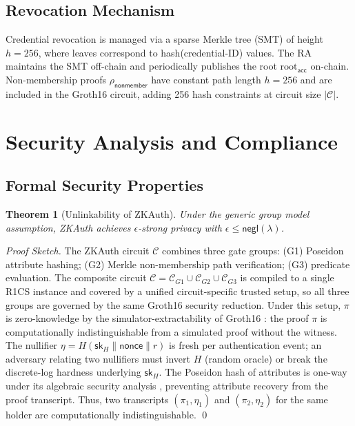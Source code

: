 \documentclass[journal,12pt,onecolumn]{IEEEtran}
\newtheorem{theorem}{Theorem}
\begin{document}
\subsection{Revocation Mechanism}
\label{sec:revocation}

Credential revocation is managed via a sparse Merkle tree (SMT)
\cite{khovratovich2023merkle} of height $h = 256$, where leaves
correspond to hash(credential-ID) values. The RA maintains the SMT
off-chain and periodically publishes the root $\text{root}_{\mathsf{acc}}$
on-chain. Non-membership proofs $\rho_{\mathsf{nonmember}}$ have constant
path length $h = 256$ and are included in the Groth16 circuit, adding
256 hash constraints at circuit size $|\mathcal{C}|$.

\section{Security Analysis and Compliance}
\label{sec:security}

\subsection{Formal Security Properties}

\begin{theorem}[Unlinkability of ZKAuth]
\label{thm:unlinkability}
Under the generic group model assumption, ZKAuth achieves
$\epsilon$-strong privacy with $\epsilon \leq \mathsf{negl}(\lambda)$.
\end{theorem}

\begin{proof}[Proof Sketch]
The ZKAuth circuit $\mathcal{C}$ combines three gate groups:
(G1) Poseidon attribute hashing; (G2) Merkle non-membership path
verification; (G3) predicate evaluation. The composite circuit
$\mathcal{C} = \mathcal{C}_{G1} \cup \mathcal{C}_{G2} \cup \mathcal{C}_{G3}$
is compiled to a single R1CS instance and covered by a unified
circuit-specific trusted setup, so all three groups are governed by
the same Groth16 security reduction. Under this setup, $\pi$ is
zero-knowledge by the simulator-extractability of Groth16
\cite{groth2016size}: the proof $\pi$ is computationally
indistinguishable from a simulated proof without the witness. The
nullifier $\eta = H(\mathsf{sk}_H \| \mathsf{nonce} \| r)$ is
fresh per authentication event; an adversary relating two nullifiers
must invert $H$ (random oracle) or break the discrete-log hardness
underlying $\mathsf{sk}_H$. The Poseidon hash of attributes is
one-way under its algebraic security analysis
\cite{grassi2021poseidon}, preventing attribute recovery from the
proof transcript. Thus, two transcripts $(\pi_1, \eta_1)$ and
$(\pi_2, \eta_2)$ for the same holder are computationally
indistinguishable. \qed
\end{proof}
\end{document}

